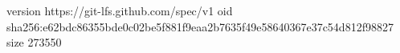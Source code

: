 version https://git-lfs.github.com/spec/v1
oid sha256:e62bdc86355bde0c02be5f881f9eaa2b7635f49e58640367e37c54d812f98827
size 273550
